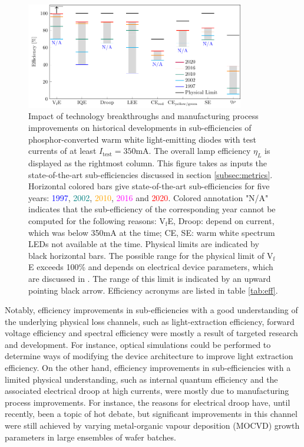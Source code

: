 \documentclass[a4paper,nocompress]{spie}  %
\begin{document}
    \begin{figure} [ht]
        \begin{center}
            \includegraphics[width=0.85\textwidth]{SPIE/article/breakthroughs_efficiency.pdf}
        \end{center}
        \caption{Impact of technology breakthroughs and manufacturing process improvements on historical developments in sub-efficiencies of phosphor-converted warm white light-emitting diodes with test currents of at least $I_\text{test}=350$mA. The overall lamp efficiency $\eta_L$ is displayed as the rightmost column. This figure takes as inputs the state-of-the-art sub-efficiencies discussed in section \ref{subsec:metrics}. Horizontal colored bars give state-of-the-art sub-efficiencies for five years: \textcolor{blue}{1997}, \textcolor{teal}{2002}, \textcolor{orange}{2010}, \textcolor{magenta}{2016} and \textcolor{red}{2020}. Colored annotation "N/A" indicates that the sub-efficiency of the corresponding year cannot be computed for the following reasons: V$_\text{f}$E, Droop: depend on current, which was below 350mA at the time; CE, SE: warm white spectrum LEDs not available at the time. Physical limits are indicated by black horizontal bars. The possible range for the physical limit of V$_\text{f}$E exceeds 100\% and depends on electrical device parameters, which are discussed in \cite{david2016electrical}. The range of this limit is indicated by an upward pointing black arrow. Efficiency acronyms are listed in table \ref{tab:eff}.}
        \label{fig:efficiency}
    \end{figure}
    
    Notably, efficiency improvements in sub-efficiencies with a good understanding of the underlying physical loss channels, such as light-extraction efficiency, forward voltage efficiency and spectral efficiency were mostly a result of targeted research and development. For instance, optical simulations could be performed to determine ways of modifying the device architecture to improve light extraction efficiency. On the other hand, efficiency improvements in sub-efficiencies with a limited physical understanding, such as internal quantum efficiency and the associated electrical droop at high currents, were mostly due to manufacturing process improvements. For instance, the reasons for electrical droop have, until recently, been a topic of hot debate, but significant improvements in this channel were still achieved by varying metal-organic vapour deposition (MOCVD) growth parameters in large ensembles of wafer batches.
\end{document}
